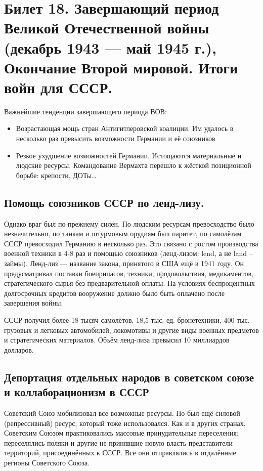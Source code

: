\section{Билет 18. Завершающий период Великой Отечественной войны (декабрь 1943 — май 1945 г.), Окончание Второй мировой. Итоги войн для СССР.}


Важнейшие тенденции завершающего периода ВОВ:
\begin{itemize}
    \item Возрастающая мощь стран Антигитлеровской коалиции. Им удалось в несколько раз превысить возможности Германии и её союзников
    \item Резкое ухудшение возможностей Германии. Истощаются материальные и людские ресурсы. Командование Вермахта перешло к жёсткой позиционной борьбе: крепости, ДОТы\dots
\end{itemize}

\subsection{Помощь союзников СССР по ленд-лизу.}

Однако враг был по-прежнему силён. По людским ресурсам превосходство было незначительно, по танкам и штурмовым орудиям был паритет, по самолётам СССР превосходил Германию в несколько раз. Это связано с ростом производства военной техники в 4-8 раз и помощью союзников (ленд-лизом: lend, а не land -- займы). Ленд-лиз --- название закона, принятого в США ещё в 1941 году. Он предусматривал поставки боеприпасов, техники, продовольствия, медикаментов, стратегического сырья без предварительной оплаты. На условиях беспроцентных долгосрочных кредитов вооружение должно было быть оплачено после завершения войны.

СССР получил более 18 тысяч самолётов, 18,5 тыс. ед. бронетехники, 400 тыс. грузовых и легковых автомобилей, локомотивы и другие виды военных предметов и стратегических материалов. Объём ленд-лиза превысил 10 миллиардов долларов.

\subsection{Депортация отдельных народов в советском союзе и коллаборационизм в СССР}

Советский Союз мобилизовал все возможные ресурсы. Но был ещё силовой (репрессивный) ресурс, который тоже использовался. Как и в других странах, Советским Союзом практиковались массовые принудительные переселения: переселялись поляки и другие не принявшие новую власть представители территорий, присоединённых к СССР. Все они отправлялись в отдалённые регионы Советского Союза.

